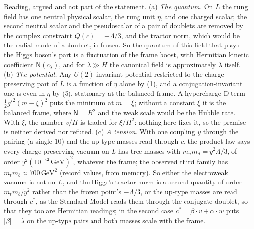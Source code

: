 Reading, argued and not part of the statement. (a) \emph{The quantum.} On $L$ the rung field has one neutral physical scalar, the rung unit $\eta$, and one charged scalar; the second neutral scalar and the pseudoscalar of a pair of doublets are removed by the complex constraint $Q(c) = -\Lambda/3$, and the tractor norm, which would be the radial mode of a doublet, is frozen. So the quantum of this field that plays the Higgs boson's part is a fluctuation of the frame boost, with Hermitian kinetic coefficient $\mathsf{N}(c_{\lambda})$, and for $\lambda \gg H$ the canonical field is approximately $\lambda$ itself. (b) \emph{The potential.} Any $U(2)$-invariant potential restricted to the charge-preserving part of $L$ is a function of $\eta$ alone by (1), and a conjugation-invariant one is even in $\eta$ by (5), stationary at the balanced frame. A hypercharge D-term $\tfrac12 g'^{2}(m - \xi)^{2}$ puts the minimum at $m = \xi$; without a constant $\xi$ it is the balanced frame, where $\mathsf{N} = H^{2}$ and the weak scale would be the Hubble rate. With $\xi$, the number $v/H$ is traded for $\xi/H^{2}$: nothing here fixes it, so the premise  is neither derived nor refuted. (c) \emph{A tension.} With one coupling $y$ through the pairing (a single $10$) and the up-type masses read through $c$, the product law says every charge-preserving vacuum on $L$ has tree masses with $m_{u}m_{d} = y^{2}\Lambda/3$, of order $y^{2}(10^{-42}\,\mathrm{GeV})^{2}$, whatever the frame; the observed third family has $m_{t}m_{b} \approx 700\,\mathrm{GeV}^{2}$ (record values, from memory). So either the electroweak vacuum is not on $L$, and the Higgs's tractor norm is a second quantity of order $m_{t}m_{b}/y^{2}$ rather than the frozen point's $-\Lambda/3$, or the up-type masses are read through $c^{*}$, as the Standard Model reads them through the conjugate doublet, so that they too are Hermitian readings; in the second case $c^{*} = \bar{\beta}\cdot v + \bar{\alpha}\cdot w$ puts $|\beta| = \lambda$ on the up-type pairs and both masses scale with the frame.
